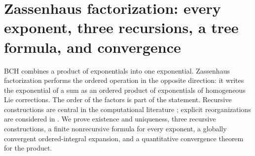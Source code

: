 \section{Zassenhaus factorization: every exponent, three recursions, a tree formula, and convergence}\label{sec:zassenhaus}
BCH combines a product of exponentials into one exponential. Zassenhaus
factorization performs the ordered operation in the opposite direction:
it writes the exponential of a sum as an ordered product of exponentials of
homogeneous Lie corrections. The order of the factors is part of the
statement. Recursive constructions are central in the computational
literature \cite{casasmuruanadinic}; explicit reorganizations are
considered in \cite{kimura}. We prove existence and uniqueness, three
recursive constructions, a finite nonrecursive formula for every exponent,
a globally convergent ordered-integral expansion, and a quantitative
convergence theorem for the product.

